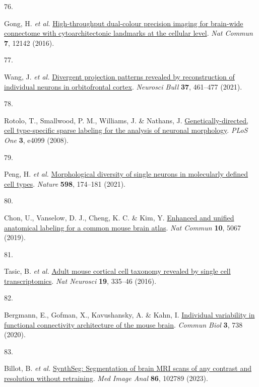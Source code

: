 \documentclass[
  12pt,
]{article}
\newlength{\cslhangindent}
\newlength{\csllabelwidth}
\newenvironment{CSLReferences}[2] %
 {\begin{list}{}{%
  \setlength{\itemindent}{0pt}
  \setlength{\leftmargin}{0pt}
  \setlength{\parsep}{0pt}
  \ifodd #1
   \setlength{\leftmargin}{\cslhangindent}
   \setlength{\itemindent}{-1\cslhangindent}
  \fi
  \setlength{\itemsep}{#2\baselineskip}}}
 {\end{list}}
\newcommand{\CSLLeftMargin}[1]{\parbox[t]{\csllabelwidth}{\strut#1\strut}}
\newcommand{\CSLRightInline}[1]{\parbox[t]{\linewidth - \csllabelwidth}{\strut#1\strut}}
\begin{document}
\begin{CSLReferences}{0}{0}
\CSLLeftMargin{76. }%
\CSLRightInline{Gong, H. \emph{et al.}
\href{https://doi.org/10.1038/ncomms12142}{High-throughput dual-colour
precision imaging for brain-wide connectome with cytoarchitectonic
landmarks at the cellular level}. \emph{Nat Commun} \textbf{7}, 12142
(2016).}

\CSLLeftMargin{77. }%
\CSLRightInline{Wang, J. \emph{et al.}
\href{https://doi.org/10.1007/s12264-020-00616-1}{Divergent projection
patterns revealed by reconstruction of individual neurons in
orbitofrontal cortex}. \emph{Neurosci Bull} \textbf{37}, 461--477
(2021).}

\CSLLeftMargin{78. }%
\CSLRightInline{Rotolo, T., Smallwood, P. M., Williams, J. \& Nathans,
J.
\href{https://doi.org/10.1371/journal.pone.0004099}{Genetically-directed,
cell type-specific sparse labeling for the analysis of neuronal
morphology}. \emph{PLoS One} \textbf{3}, e4099 (2008).}

\CSLLeftMargin{79. }%
\CSLRightInline{Peng, H. \emph{et al.}
\href{https://doi.org/10.1038/s41586-021-03941-1}{Morphological
diversity of single neurons in molecularly defined cell types}.
\emph{Nature} \textbf{598}, 174--181 (2021).}

\CSLLeftMargin{80. }%
\CSLRightInline{Chon, U., Vanselow, D. J., Cheng, K. C. \& Kim, Y.
\href{https://doi.org/10.1038/s41467-019-13057-w}{Enhanced and unified
anatomical labeling for a common mouse brain atlas}. \emph{Nat Commun}
\textbf{10}, 5067 (2019).}

\CSLLeftMargin{81. }%
\CSLRightInline{Tasic, B. \emph{et al.}
\href{https://doi.org/10.1038/nn.4216}{Adult mouse cortical cell
taxonomy revealed by single cell transcriptomics}. \emph{Nat Neurosci}
\textbf{19}, 335--46 (2016).}

\CSLLeftMargin{82. }%
\CSLRightInline{Bergmann, E., Gofman, X., Kavushansky, A. \& Kahn, I.
\href{https://doi.org/10.1038/s42003-020-01472-5}{Individual variability
in functional connectivity architecture of the mouse brain}.
\emph{Commun Biol} \textbf{3}, 738 (2020).}

\CSLLeftMargin{83. }%
\CSLRightInline{Billot, B. \emph{et al.}
\href{https://doi.org/10.1016/j.media.2023.102789}{SynthSeg:
Segmentation of brain MRI scans of any contrast and resolution without
retraining}. \emph{Med Image Anal} \textbf{86}, 102789 (2023).}


\end{CSLReferences}
\end{document}
